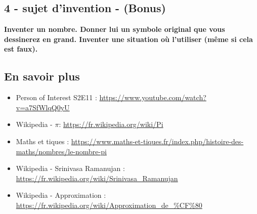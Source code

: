 \documentclass[11pt]{article}
\begin{document}
\vspace{-0.4cm}
 \subsection*{4 - sujet d'invention - (Bonus)}

\textbf{Inventer un nombre. Donner lui un symbole original que vous dessinerez en grand. Inventer une situation où l'utiliser (même si cela est faux).}

\vspace{-0.4cm}
\subsection*{En savoir plus}

\begin{itemize}
  \item Person of Interest S2E11 : \url{https://www.youtube.com/watch?v=a7SfWlqQ0yU}
  \item Wikipedia - $\pi$: \url{https://fr.wikipedia.org/wiki/Pi}
  \item Maths et tiques : \url{https://www.maths-et-tiques.fr/index.php/histoire-des-maths/nombres/le-nombre-pi}
  \item Wikipedia - Srinivasa Ramanujan : \url{https://fr.wikipedia.org/wiki/Srinivasa_Ramanujan}
  \item Wikipedia - Approximation : \url{https://fr.wikipedia.org/wiki/Approximation_de_%CF%80}
\end{itemize}
\end{document}
